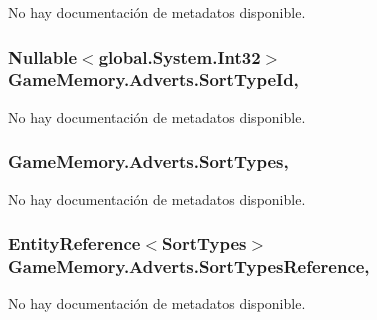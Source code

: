 No hay documentación de metadatos disponible. 

\hypertarget{class_game_memory_1_1_adverts_a28c7f653f4c8f1d88ab3520408486ea3}{
\subsubsection[{Sort\-Type\-Id}]{\setlength{\rightskip}{0pt plus 5cm}Nullable$<$global.\-System.\-Int32$>$ Game\-Memory.\-Adverts.\-Sort\-Type\-Id\hspace{0.3cm}{\ttfamily [get]}, {\ttfamily [set]}}}\label{class_game_memory_1_1_adverts_a28c7f653f4c8f1d88ab3520408486ea3}


No hay documentación de metadatos disponible. 

\hypertarget{class_game_memory_1_1_adverts_a1466cfee905d0224c01bf20ef517ecfb}{
\subsubsection[{Sort\-Types}]{ Game\-Memory.\-Adverts.\-Sort\-Types\hspace{0.3cm}{\ttfamily [get]}, {\ttfamily [set]}}}\label{class_game_memory_1_1_adverts_a1466cfee905d0224c01bf20ef517ecfb}


No hay documentación de metadatos disponible. 

\hypertarget{class_game_memory_1_1_adverts_a0e104d4a5eb16d3fe324396a2982eff3}{
\subsubsection[{Sort\-Types\-Reference}]{\setlength{\rightskip}{0pt plus 5cm}Entity\-Reference$<${\bf Sort\-Types}$>$ Game\-Memory.\-Adverts.\-Sort\-Types\-Reference\hspace{0.3cm}{\ttfamily [get]}, {\ttfamily [set]}}}\label{class_game_memory_1_1_adverts_a0e104d4a5eb16d3fe324396a2982eff3}


No hay documentación de metadatos disponible. 

